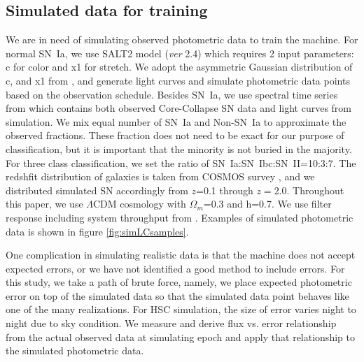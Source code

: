 \documentclass[proof]{pasj01}
\begin{document}
\subsection{Simulated data for training}
\label{sec:training}
We are in need of simulating observed photometric data to train the machine.  
For normal SN~Ia, we use SALT2 \citep{guy10b} model ({\it ver} 2.4) which requires 2 input parameters: c for color and x1 for stretch.
We adopt the asymmetric Gaussian distribution of c, and x1 from \citet{mosher14a}, and generate
light curves and simulate photometric data points based on the observation schedule. 
Besides SN~Ia, we use spectral time series from \citet{kessler19b} which contains both observed Core-Collapse SN data and light curves from simulation.
We mix equal number of SN~Ia and Non-SN~Ia to approximate the observed fractions. 
These fraction does not need to be exact for our purpose of classification, but it is important
that the minority is not buried in the majority.
For three class classification, we set the ratio of SN~Ia:SN~Ibc:SN~II=10:3:7.
The redshfit distribution of galaxies is taken from COSMOS survey \citep{laigle16a}, and we distributed simulated SN accordingly from $z$=0.1 through $z=$2.0.
Throughout this paper, we use $\Lambda$CDM cosmology with $\Omega_{m}$=0.3 and h=0.7.
We use filter response including system throughput from \citet{kawanomoto18a}. 
Examples of simulated photometric data is shown in figure \ref{fig:simLCsamples}.

One complication in simulating realistic data is that the machine does not accept expected errors, or we have not identified a good method to include errors.   
For this study, we take a path of brute force, namely, we place expected photometric error on top of the simulated data so that the simulated data point behaves like one of the many realizations.
For HSC simulation, the size of error varies night to night due to sky condition. 
We measure and derive flux vs. error relationship from the actual observed data at simulating epoch and apply that relationship to the simulated photometric data.
\end{document}
